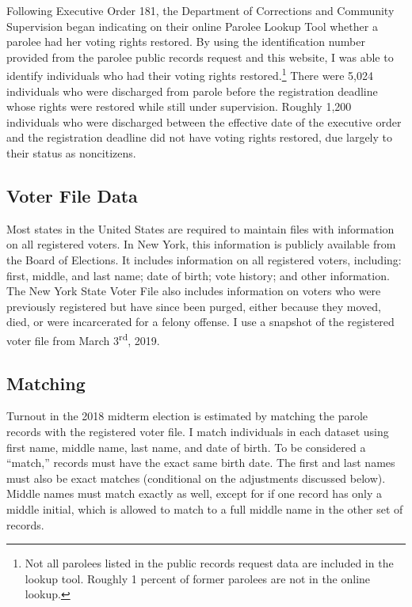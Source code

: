 \documentclass[
  12pt,
]{article}
\begin{document}
Following Executive Order 181, the Department of Corrections and Community Supervision began indicating on their online Parolee Lookup Tool whether a parolee had her voting rights restored. By using the identification number provided from the parolee public records request and this website, I was able to identify individuals who had their voting rights restored.\footnote{Not all parolees listed in the public records request data are included in the lookup tool. Roughly 1 percent of former parolees are not in the online lookup.} There were 5,024 individuals who were discharged from parole before the registration deadline whose rights were restored while still under supervision. Roughly 1,200 individuals who were discharged between the effective date of the executive order and the registration deadline did not have voting rights restored, due largely to their status as noncitizens.

\hypertarget{voter-file-data}{%
\subsection*{Voter File Data}\label{voter-file-data}}

Most states in the United States are required to maintain files with information on all registered voters. In New York, this information is publicly available from the Board of Elections. It includes information on all registered voters, including: first, middle, and last name; date of birth; vote history; and other information. The New York State Voter File also includes information on voters who were previously registered but have since been purged, either because they moved, died, or were incarcerated for a felony offense. I use a snapshot of the registered voter file from March 3\textsuperscript{rd}, 2019.

\hypertarget{matching}{%
\subsection*{Matching}\label{matching}}

Turnout in the 2018 midterm election is estimated by matching the parole records with the registered voter file. I match individuals in each dataset using first name, middle name, last name, and date of birth. To be considered a ``match,'' records must have the exact same birth date. The first and last names must also be exact matches (conditional on the adjustments discussed below). Middle names must match exactly as well, except for if one record has only a middle initial, which is allowed to match to a full middle name in the other set of records.
\end{document}
